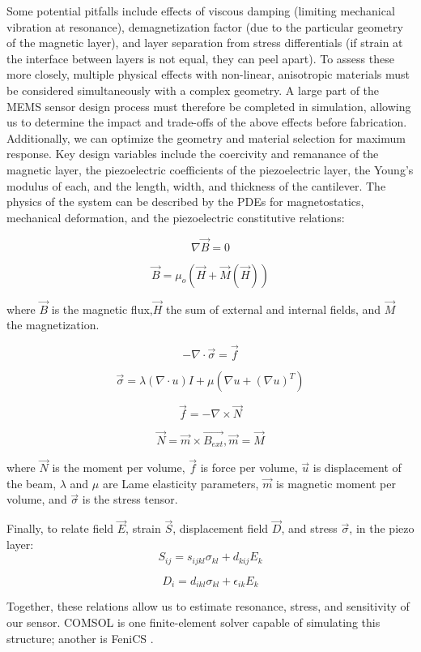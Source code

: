  Some potential pitfalls include effects of viscous damping (limiting mechanical vibration at resonance), demagnetization factor (due to the particular geometry of the magnetic layer), and layer separation from stress differentials (if strain at the interface between layers is not equal, they can peel apart). To assess these more closely, multiple physical effects with non-linear, anisotropic materials must be considered simultaneously with a complex geometry. A large part of the MEMS sensor design process must therefore be completed in simulation, allowing us to determine the impact and trade-offs of the above effects before fabrication. Additionally, we can optimize the geometry and material selection for maximum response. Key design variables include the coercivity and remanance of the magnetic layer, the piezoelectric coefficients of the piezoelectric layer, the Young's modulus of each, and the length, width, and thickness of the cantilever. The physics of the system can be described by the PDEs for magnetostatics, mechanical deformation, and the piezoelectric constitutive relations:

 $$ \nabla \vec{B} = 0$$

 $$ \vec{B} = \mu_o(\vec{H}+\vec{M}(\vec{H}))$$

where $\vec{B}$ is the magnetic flux,$\vec{H}$ the sum of external and internal fields, and $\vec{M}$ the magnetization.
 
 $$ -\nabla\cdot\vec{\sigma}=\vec{f}$$
 
 $$ \vec{\sigma} = \lambda(\nabla\cdot u)I+\mu(\nabla u +(\nabla u)^T)$$

 $$ \vec{f} = -\nabla\times\vec{N}$$
 
$$ \vec{N} = \vec{m} \times \vec{B_{ext}}, \vec{m} = \vec{M} $$

where $\vec{N}$ is the moment per volume, $\vec{f}$ is force per volume, $\vec{u}$ is displacement of the beam, $\lambda$ and $\mu$ are Lame elasticity parameters, $\vec{m}$ is magnetic moment per volume, and $\vec{\sigma}$ is the stress tensor.

Finally, to relate field $\vec{E}$, strain $\vec{S}$, displacement field $\vec{D}$, and stress $\vec{\sigma}$, in the piezo layer:
 $$S_{ij} = s_{ijkl}\sigma_{kl}+d_{kij}E_{k}$$

$$D_i=d_{ikl}\sigma_{kl}+\epsilon_{ik}E_{k}$$
 
Together, these relations allow us to estimate resonance, stress, and sensitivity of our sensor. COMSOL is one finite-element solver capable of simulating  this structure; another is FeniCS \cite{dupont2003fenics}.


